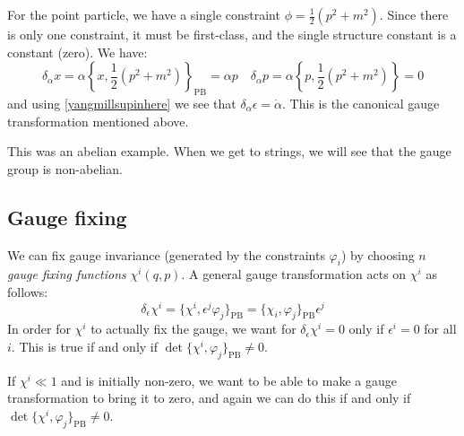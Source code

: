 \documentclass{jknotes}
\begin{document}
\begin{eg}
    For the point particle, we have a single constraint \(\phi=\frac{1}{2}(p^2+m^2)\). Since there is only one constraint, it must be first-class, and the single structure constant is a constant (zero). We have:
    \begin{equation}
        \delta_\alpha x = \alpha \left\{ x,\frac{1}{2}(p^2+m^2) \right\}_{\text{PB}} = \alpha p 
        \quad
        \delta_\alpha p = \alpha \left\{ p,\frac{1}{2}(p^2+m^2) \right\} = 0
    \end{equation}
    and using \eqref{yangmillsupinhere} we see that \(\delta_\alpha\epsilon = \dot{\alpha}\). This is the canonical gauge transformation mentioned above.
\end{eg}
This was an abelian example. When we get to strings, we will see that the gauge group is non-abelian.

\subsection{Gauge fixing}
We can fix gauge invariance (generated by the constraints \(\varphi_i\)) by choosing \(n\) \emph{gauge fixing functions} \(\chi^i(q,p)\). A general gauge transformation acts on \(\chi^i\) as follows:
\begin{equation}
    \delta_\epsilon \chi^i = \{\chi^i,\epsilon^j\varphi_j\}_{\text{PB}} = \{\chi_i,\varphi_j\}_{\text{PB}}\epsilon^j
\end{equation}
In order for \(\chi^i\) to actually fix the gauge, we want for \(\delta_\epsilon\chi^i=0\) only if \(\epsilon^i=0\) for all \(i\). This is true if and only if \(\det\{\chi^i,\varphi_j\}_{\text{PB}}\ne0\).

If \(\chi^i\ll1\) and is initially non-zero, we want to be able to make a gauge transformation to bring it to zero, and again we can do this if and only if \(\det\{\chi^i,\varphi_j\}_{\text{PB}}\ne0\).
\end{document}
